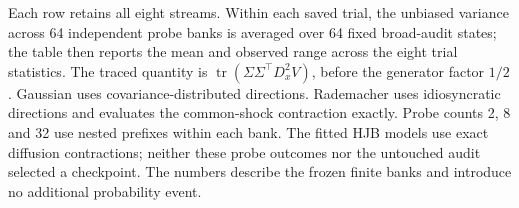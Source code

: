 \par\medskip\noindent\footnotesize Each row retains all eight streams. Within each saved trial, the unbiased variance across 64 independent probe banks is averaged over 64 fixed broad-audit states; the table then reports the mean and observed range across the eight trial statistics. The traced quantity is $\operatorname{tr}(\Sigma\Sigma^\top D_x^2V)$, before the generator factor $1/2$. Gaussian uses covariance-distributed directions. Rademacher uses idiosyncratic directions and evaluates the common-shock contraction exactly. Probe counts 2, 8 and 32 use nested prefixes within each bank. The fitted HJB models use exact diffusion contractions; neither these probe outcomes nor the untouched audit selected a checkpoint. The numbers describe the frozen finite banks and introduce no additional probability event.
\endgroup
